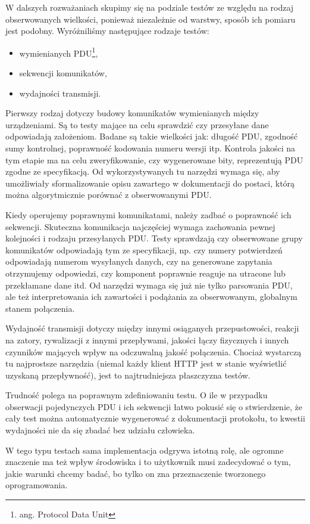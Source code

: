 \documentclass[00-praca-magisterska.tex]{subfiles}
\begin{document}
W dalszych rozważaniach skupimy się na podziale testów ze względu na rodzaj
obserwowanych wielkości, ponieważ niezależnie od warstwy, sposób ich pomiaru
jest podobny. Wyróżniliśmy następujące rodzaje testów:
\begin{itemize}
  \item wymienianych PDU\footnote{ang. Protocol Data Unit},
  \item sekwencji komunikatów,
  \item wydajności transmisji.
\end{itemize}

Pierwszy rodzaj dotyczy budowy komunikatów wymienianych między urządzeniami. Są
to testy mające na celu sprawdzić czy przesyłane dane odpowiadają założeniom.
Badane są takie wielkości jak: długość PDU, zgodność sumy kontrolnej,
poprawność kodowania numeru wersji itp. Kontrola jakości na tym etapie ma na
celu zweryfikowanie, czy wygenerowane bity, reprezentują PDU zgodne ze
specyfikacją. Od wykorzystywanych tu narzędzi wymaga się, aby umożliwiały
sformalizowanie opisu zawartego w dokumentacji do postaci, którą można
algorytmicznie porównać z obserwowanymi PDU.

Kiedy operujemy poprawnymi komunikatami, należy zadbać o poprawność ich
sekwencji. Skuteczna komunikacja najczęściej wymaga zachowania pewnej
kolejności i rodzaju przesyłanych PDU. Testy sprawdzają czy obserwowane grupy
komunikatów odpowiadają tym ze specyfikacji, np. czy numery potwierdzeń
odpowiadają numerom wysyłanych danych, czy na generowane zapytania otrzymujemy
odpowiedzi, czy komponent poprawnie reaguje na utracone lub przekłamane dane
itd. Od narzędzi wymaga się już nie tylko parsowania PDU, ale też
interpretowania ich zawartości i podążania za obserwowanym, globalnym stanem
połączenia.

Wydajność transmisji dotyczy między innymi osiąganych przepustowości, reakcji
na zatory, rywalizacji z innymi przepływami, jakości łączy fizycznych i innych
czynników mających wpływ na odczuwalną jakość połączenia. Chociaż wystarczą tu
najprostsze narzędzia (niemal każdy klient HTTP jest w stanie wyświetlić
uzyskaną przepływność), jest to najtrudniejsza płaszczyzna testów.

Trudność polega na poprawnym zdefiniowaniu testu. O ile w przypadku obserwacji
pojedynczych PDU i ich sekwencji łatwo pokusić się o stwierdzenie, że cały test
można automatycznie wygenerować z dokumentacji protokołu, to kwestii wydajności
nie da się zbadać bez udziału człowieka.

W tego typu testach sama implementacja odgrywa istotną rolę, ale ogromne
znaczenie ma też wpływ środowiska i to użytkownik musi zadecydować o tym, jakie
warunki chcemy badać, bo tylko on zna przeznaczenie tworzonego oprogramowania.
\end{document}
